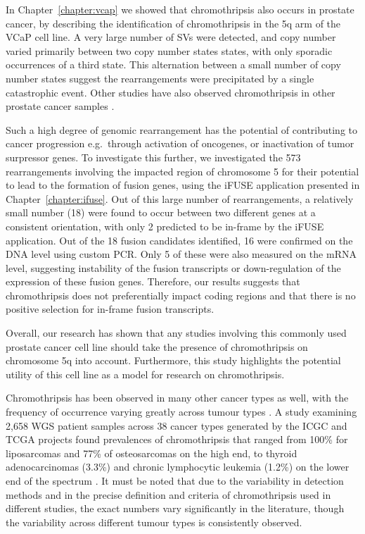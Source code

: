 In Chapter~\ref{chapter:vcap} we showed that chromothripsis also occurs in prostate cancer, by describing the identification of chromothripsis in the 5q arm of the VCaP cell line. A very large number of SVs were detected, and copy number varied primarily between two copy number states states, with only sporadic occurrences of a third state. This alternation between a small number of copy number states suggest the rearrangements were precipitated by a single catastrophic event.
Other studies have also observed chromothripsis in other prostate cancer samples \cite{wu2012poly,Baca2013}.

Such a high degree of genomic rearrangement has the potential of contributing to cancer progression e.g.\ through activation of oncogenes, or inactivation of tumor surpressor genes.
To investigate this further, we investigated the 573 rearrangements involving the impacted region of chromosome 5 for their potential to lead to the formation of fusion genes, using the iFUSE application presented in Chapter~\ref{chapter:ifuse}.
Out of this large number of rearrangements, a relatively small number (18) were found to occur between two different genes at a consistent orientation, with only 2 predicted to be in-frame by the iFUSE application.
Out of the 18 fusion candidates identified, 16 were confirmed on the DNA level using custom PCR\@.
Only 5 of these were also measured on the mRNA level, suggesting instability of the fusion transcripts or down-regulation of the expression of these fusion genes.
Therefore, our results suggests that chromothripsis does not preferentially impact coding regions and that there is no positive selection for in-frame fusion transcripts.

Overall, our research has shown that any studies involving this commonly used prostate cancer cell line should take the presence of chromothripsis on chromosome 5q into account.
Furthermore, this study highlights the potential utility of this cell line as a model for research on chromothripsis.

Chromothripsis has been observed in many other cancer types as well, with the frequency of occurrence varying greatly across tumour types \cite{cortes2020comprehensive,voronina2020landscape,Koltsova2019,kloosterman2014prevalence}.
A study examining 2,658 WGS patient samples across 38 cancer types generated by the ICGC and TCGA projects found prevalences of chromothripsis that ranged from 100\% for liposarcomas and 77\% of osteosarcomas on the high end, to thyroid adenocarcinomas (3.3\%) and chronic lymphocytic leukemia (1.2\%) on the lower end of the spectrum \cite{cortes2020comprehensive}.
It must be noted that due to the variability in detection methods and in the precise definition and criteria of chromothripsis used in different studies, the exact numbers vary significantly in the literature, though the variability across different tumour types is consistently observed.

